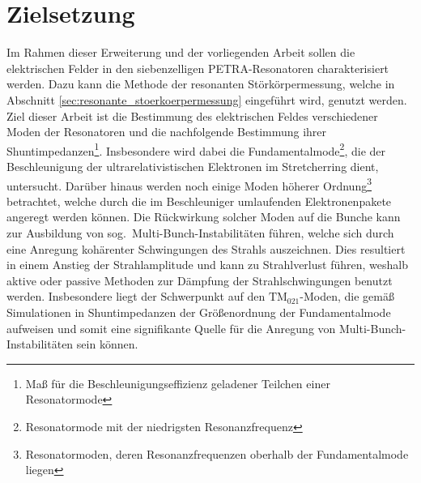 \section{Zielsetzung}
Im Rahmen dieser Erweiterung und der vorliegenden Arbeit sollen die elektrischen Felder in den siebenzelligen PETRA-Resonatoren charakterisiert werden.
Dazu kann die Methode der resonanten Störkörpermessung, welche in Abschnitt \ref{sec:resonante_stoerkoerpermessung} eingeführt wird, genutzt werden.
Ziel dieser Arbeit ist die Bestimmung des elektrischen Feldes verschiedener Moden der Resonatoren und die nachfolgende Bestimmung ihrer Shuntimpedanzen\footnote{Maß für die Beschleunigungseffizienz geladener Teilchen einer Resonatormode}.
Insbesondere wird dabei die Fundamentalmode\footnote{Resonatormode mit der niedrigsten Resonanzfrequenz}, die der Beschleunigung der ultrarelativistischen Elektronen im Stretcherring dient, untersucht.
Darüber hinaus werden noch einige Moden höherer Ordnung\footnote{Resonatormoden, deren Resonanzfrequenzen oberhalb der Fun\-da\-men\-tal\-mode liegen} betrachtet, welche durch die im Beschleuniger umlaufenden Elektronenpakete angeregt werden können.
Die Rückwirkung solcher Moden auf die Bunche kann zur Ausbildung von sog.\ Multi-Bunch-Instabilitäten führen, welche sich durch eine Anregung kohärenter Schwingungen des Strahls auszeichnen.
Dies resultiert in einem Anstieg der Strahlamplitude und kann zu Strahlverlust führen, weshalb aktive oder passive Methoden zur Dämpfung der Strahlschwingungen benutzt werden.
Insbesondere liegt der Schwerpunkt auf den $\mathrm{TM}_{021}$-Moden, die gemäß Simulationen in \cite{schedler} Shuntimpedanzen der Größenordnung der Fundamentalmode aufweisen und somit eine signifikante Quelle für die Anregung von Multi-Bunch-Instabilitäten sein können.
